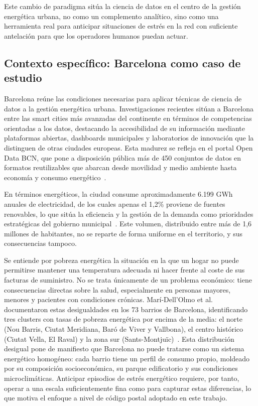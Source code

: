 \documentclass[12pt, a4paper]{article}
\begin{document}
Este cambio de paradigma sitúa la ciencia de datos en el centro de la gestión energética urbana, no como un complemento analítico, sino como una herramienta real para anticipar situaciones de estrés en la red con suficiente antelación para que los operadores humanos puedan actuar.

\subsection{Contexto específico: Barcelona como caso de estudio}


Barcelona reúne las condiciones necesarias para aplicar técnicas de ciencia de datos a la gestión energética urbana. Investigaciones recientes sitúan a Barcelona entre las smart cities más avanzadas del continente en términos de competencias orientadas a los datos, destacando la accesibilidad de su información mediante plataformas abiertas, dashboards municipales y laboratorios de innovación que la distinguen de otras ciudades europeas. Esta madurez se refleja en el portal Open Data BCN, que pone a disposición pública más de 450 conjuntos de datos en formatos reutilizables que abarcan desde movilidad y medio ambiente hasta economía y consumo energético~\cite{krogstie2020}.

En términos energéticos, la ciudad consume aproximadamente 6.199 GWh anuales de electricidad, de los cuales apenas el 1,2\% proviene de fuentes renovables, lo que sitúa la eficiencia y la gestión de la demanda como prioridades estratégicas del gobierno municipal~\cite{ajuntament2022}. Este volumen, distribuido entre más de 1,6 millones de habitantes, no se reparte de forma uniforme en el territorio, y sus consecuencias tampoco.

Se entiende por pobreza energética la situación en la que un hogar no puede permitirse mantener una temperatura adecuada ni hacer frente al coste de sus facturas de suministro. No se trata únicamente de un problema económico: tiene consecuencias directas sobre la salud, especialmente en personas mayores, menores y pacientes con condiciones crónicas. Marí-Dell'Olmo et al. documentaron estas desigualdades en los 73 barrios de Barcelona, identificando tres clusters con tasas de pobreza energética por encima de la media: el norte (Nou Barris, Ciutat Meridiana, Baró de Viver y Vallbona), el centro histórico (Ciutat Vella, El Raval) y la zona sur (Sants-Montjuïc)~\cite{maridelolmo2022}. Esta distribución desigual pone de manifiesto que Barcelona no puede tratarse como un sistema energético homogéneo: cada barrio tiene un perfil de consumo propio, moldeado por su composición socioeconómica, su parque edificatorio y sus condiciones microclimáticas. Anticipar episodios de estrés energético requiere, por tanto, operar a una escala suficientemente fina como para capturar estas diferencias, lo que motiva el enfoque a nivel de código postal adoptado en este trabajo.
\end{document}
